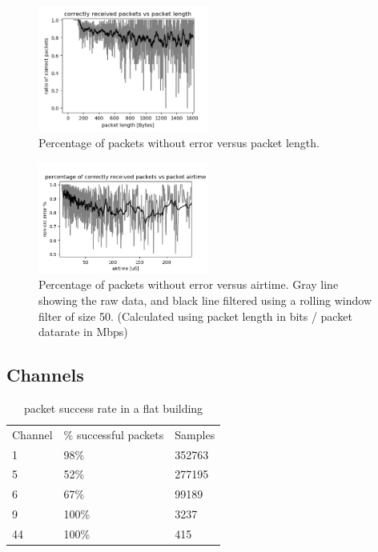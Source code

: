 \documentclass{IEEEtran}
\begin{document}
\begin{figure}
		\includegraphics[width=0.5\textwidth]{figures/length.png}
		\caption{Percentage of packets without error versus packet length.}
		\label{fig:length}
\end{figure}

\begin{figure}
		\includegraphics[width=0.5\textwidth]{figures/airtime.png}
		\caption{Percentage of packets without error versus airtime. Gray line showing the raw data, and black line filtered using a rolling window filter of size 50. (Calculated using packet length in bits / packet datarate in Mbps)}
		\label{fig:airtime}
\end{figure}


\subsection{Channels}
\begin{table}[h]
\centering
\caption{packet success rate in a flat building}
\label{tbl1}
\begin{tabular}{lll}
Channel & \% successful packets & Samples \\
1       & 98\%                          & 352763  \\
5       & 52\%                         & 277195  \\
6       & 67\%                          & 99189   \\
9       & 100\%                           & 3237    \\
44      & 100\%                           & 415    
\end{tabular}
\end{table}
\end{document}
